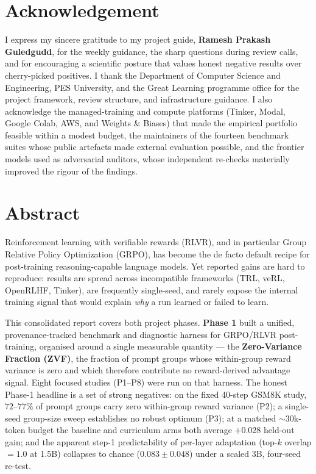 \documentclass[12pt,a4paper]{report}
\begin{document}
\chapter*{Acknowledgement}
I express my sincere gratitude to my project guide, \textbf{Ramesh Prakash
Guledgudd}, for the weekly guidance, the sharp questions during review calls, and
for encouraging a scientific posture that values honest negative results over
cherry-picked positives. I thank the Department of Computer Science and
Engineering, PES University, and the Great Learning programme office for the
project framework, review structure, and infrastructure guidance. I also
acknowledge the managed-training and compute platforms (Tinker, Modal, Google
Colab, AWS, and Weights \& Biases) that made the empirical portfolio feasible
within a modest budget, the maintainers of the fourteen benchmark suites whose
public artefacts made external evaluation possible, and the frontier models used
as adversarial auditors, whose independent re-checks materially improved the
rigour of the findings.

\chapter*{Abstract}
Reinforcement learning with verifiable rewards (RLVR), and in particular Group
Relative Policy Optimization (GRPO), has become the de facto default recipe for
post-training reasoning-capable language models. Yet reported gains are hard to
reproduce: results are spread across incompatible frameworks (TRL, veRL,
OpenRLHF, Tinker), are frequently single-seed, and rarely expose the internal
training signal that would explain \emph{why} a run learned or failed to learn.

This consolidated report covers both project phases. \textbf{Phase 1} built a
unified, provenance-tracked benchmark and diagnostic harness for GRPO/RLVR
post-training, organised around a single measurable quantity --- the
\textbf{Zero-Variance Fraction (ZVF)}, the fraction of prompt groups whose
within-group reward variance is zero and which therefore contribute no
reward-derived advantage signal. Eight focused studies (P1--P8) were run on that
harness. The honest Phase-1 headline is a set of strong negatives: on the fixed
40-step GSM8K study, $72$--$77\%$ of prompt groups carry zero within-group reward
variance (P2); a single-seed group-size sweep establishes no robust optimum (P3);
at a matched ${\sim}30$k-token budget the baseline and curriculum arms both
average $+0.028$ held-out gain; and the apparent step-1 predictability of
per-layer adaptation (top-$k$ overlap $=1.0$ at 1.5B) collapses to chance
($0.083\pm0.048$) under a scaled 3B, four-seed re-test.
\end{document}
